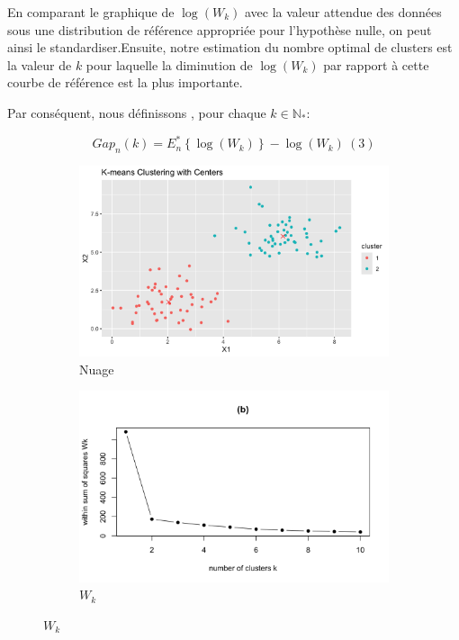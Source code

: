 En comparant le graphique de $\log (W_{k})$ avec la valeur attendue des données sous une distribution de référence appropriée pour l'hypothèse nulle, on peut ainsi le standardiser.Ensuite, notre estimation du nombre optimal de clusters est la valeur de $k$ pour laquelle la diminution de $\log (W_{k})$ par rapport à cette courbe de référence est la plus importante.

Par conséquent, nous définissons , pour chaque $k \in \mathbb{N_*}$:

$$
Gap_{n}(k) = E_{n}^{*}\left\{\log \left(W_{k}\right)\right\}-\log \left(W_{k}\right) \ (3) 
$$


\begin{figure}[H]
    \centering
    \begin{subfigure}[b]{0.45\linewidth} %
        \centering
        \includegraphics[width=\linewidth]{images/A.png}
        \caption{Nuage}
        \label{fig:image-A}
    \end{subfigure}
    \hspace{0.05\linewidth} %
    \begin{subfigure}[b]{0.45\linewidth} %
        \centering
        \includegraphics[width=\linewidth]{images/B.png}
        \caption{$W_k$}
        \label{fig:image-B}
    \end{subfigure}
    

\end{figure}
